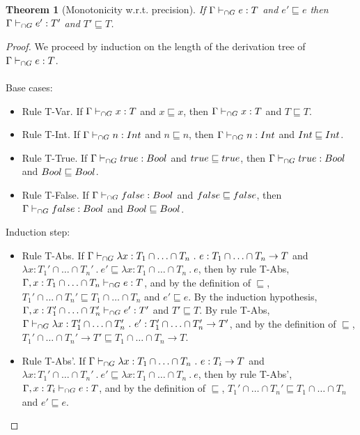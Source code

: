 \documentclass[a4paper]{article}
\newtheorem{theorem}{Theorem}
\begin{document}
\begin{theorem}[Monotonicity w.r.t. precision]
\label{monotonicity_wrt_precision}
If $\Gamma \vdash_{\cap G} e : T$ and $e' \sqsubseteq e$ then $\Gamma \vdash_{\cap G} e' : T'$ and $T' \sqsubseteq T$.
\end{theorem}
\begin{proof}
We proceed by induction on the length of the derivation tree of $\Gamma \vdash_{\cap G} e : T$.\\\\
Base cases:
\begin{itemize}
    \item Rule T-Var.
    If $\Gamma \vdash_{\cap G} x : T$ and $x \sqsubseteq x$, then $\Gamma \vdash_{\cap G} x : T$ and $T \sqsubseteq T$.
    \item Rule T-Int.
    If $\Gamma \vdash_{\cap G} n : {Int}$ and $n \sqsubseteq n$, then $\Gamma \vdash_{\cap G} n : {Int}$ and ${Int} \sqsubseteq {\ensuremath{Int}}$.
    \item Rule T-True.
    If $\Gamma \vdash_{\cap G} true : Bool$ and $true \sqsubseteq true$, then $\Gamma \vdash_{\cap G} true : Bool$ and $Bool \sqsubseteq Bool$.
    \item Rule T-False.
    If $\Gamma \vdash_{\cap G} false : Bool$ and $false \sqsubseteq false$, then $\Gamma \vdash_{\cap G} false : Bool$ and $Bool \sqsubseteq Bool$.
\end{itemize}
Induction step:
\begin{itemize}
    \item Rule T-Abs.
    If $\Gamma \vdash_{\cap G} \lambda x : T_1 \cap \ldots \cap T_n\ .\ e : T_1 \cap \ldots \cap T_n \rightarrow T$ and $\lambda x : T_1' \cap \ldots \cap T_n'\ .\ e' \sqsubseteq \lambda x : T_1 \cap \ldots \cap T_n\ .\ e$, then by rule T-Abs, $\Gamma, x : T_1 \cap \ldots \cap T_n \vdash_{\cap G} e : T$, and by the definition of $\sqsubseteq$, $T_1' \cap \ldots \cap T_n' \sqsubseteq T_1 \cap \ldots \cap T_n$ and $e' \sqsubseteq e$.
    By the induction hypothesis, $\Gamma, x : T_1' \cap \ldots \cap T_n' \vdash_{\cap G} e' : T'$ and $T' \sqsubseteq T$.
    By rule T-Abs, $\Gamma \vdash_{\cap G} \lambda x : T_1' \cap \ldots \cap T_n'\ .\ e' : T_1' \cap \ldots \cap T_n' \rightarrow T'$, and by the definition of $\sqsubseteq$, $T_1' \cap \ldots \cap T_n' \rightarrow T' \sqsubseteq T_1 \cap \ldots \cap T_n \rightarrow T$.
    \item Rule T-Abs'.
    If $\Gamma \vdash_{\cap G} \lambda x : T_1 \cap \ldots \cap T_n\ .\ e : T_i \rightarrow T$ and $\lambda x : T_1' \cap \ldots \cap T_n'\ .\ e' \sqsubseteq \lambda x : T_1 \cap \ldots \cap T_n\ .\ e$, then by rule T-Abs', $\Gamma, x : T_i \vdash_{\cap G} e : T$, and by the definition of $\sqsubseteq$, $T_1' \cap \ldots \cap T_n' \sqsubseteq T_1 \cap \ldots \cap T_n$ and $e' \sqsubseteq e$.

\end{itemize}
\end{proof}
\end{document}
